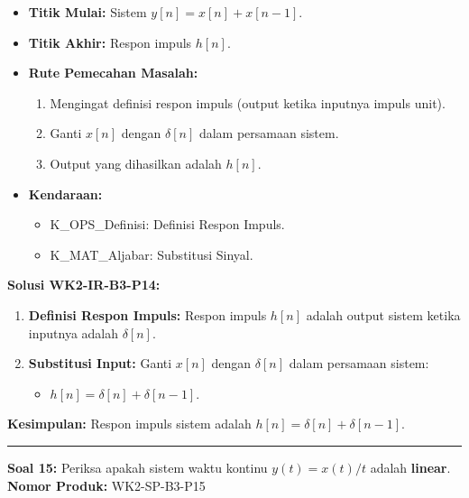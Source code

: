 \documentclass[
  letterpaper,
  DIV=11,
  numbers=noendperiod]{scrreprt}
\providecommand{\tightlist}{%
  \setlength{\itemsep}{0pt}\setlength{\parskip}{0pt}}
\begin{document}
\begin{itemize}
\tightlist
\item
  \textbf{Titik Mulai:} Sistem \(y[n] = x[n] + x[n-1]\).
\item
  \textbf{Titik Akhir:} Respon impuls \(h[n]\).
\item
  \textbf{Rute Pemecahan Masalah:}

  \begin{enumerate}
  \def\labelenumi{\arabic{enumi}.}
  \tightlist
  \item
    Mengingat definisi respon impuls (output ketika inputnya impuls
    unit).
  \item
    Ganti \(x[n]\) dengan \(\delta[n]\) dalam persamaan sistem.
  \item
    Output yang dihasilkan adalah \(h[n]\).
  \end{enumerate}
\item
  \textbf{Kendaraan:}

  \begin{itemize}
  \tightlist
  \item
    K\_OPS\_Definisi: Definisi Respon Impuls.
  \item
    K\_MAT\_Aljabar: Substitusi Sinyal.
  \end{itemize}
\end{itemize}

\textbf{Solusi WK2-IR-B3-P14:}

\begin{enumerate}
\def\labelenumi{\arabic{enumi}.}
\tightlist
\item
  \textbf{Definisi Respon Impuls:} Respon impuls \(h[n]\) adalah output
  sistem ketika inputnya adalah \(\delta[n]\).
\item
  \textbf{Substitusi Input:} Ganti \(x[n]\) dengan \(\delta[n]\) dalam
  persamaan sistem:

  \begin{itemize}
  \tightlist
  \item
    \(h[n] = \delta[n] + \delta[n-1]\).
  \end{itemize}
\end{enumerate}

\textbf{Kesimpulan:} Respon impuls sistem adalah
\textbf{\(h[n] = \delta[n] + \delta[n-1]\)}.

\begin{center}\rule{0.5\linewidth}{0.5pt}\end{center}

\textbf{Soal 15:} Periksa apakah sistem waktu kontinu \(y(t) = x(t)/t\)
adalah \textbf{linear}. \textbf{Nomor Produk:} WK2-SP-B3-P15
\end{document}

